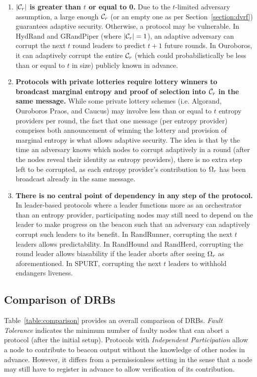 \begin{enumerate}
\item \textbf{$|\mathcal{C}_r|$ is greater than $t$ or equal to 0.} Due to the $t$-limited adversary assumption, a large enough $\mathcal{C}_r$ (or an empty one as per Section~\ref{section:dvrf}) guarantees adaptive security. Otherwise, a protocol may be vulnerable. In HydRand and GRandPiper (where $|\mathcal{C}_r| = 1$), an adaptive adversary can corrupt the next $t$ round leaders to predict $t + 1$ future rounds. In Ouroboros, it can adaptively corrupt the entire $\mathcal{C}_r$ (which could probabilistically be less than or equal to $t$ in size) publicly known in advance.
\item \textbf{Protocols with private lotteries require lottery winners to broadcast marginal entropy and proof of selection into $\mathcal{C}_r$ in the same message.} While some private lottery schemes (i.e. Algorand, Ouroboros Praos, and Caucus) may involve less than or equal to $t$ entropy providers per round, the fact that one message (per entropy provider) comprises both announcement of winning the lottery and provision of marginal entropy is what allows adaptive security. The idea is that by the time an adversary knows which nodes to corrupt adaptively in a round (after the nodes reveal their identity as entropy providers), there is no extra step left to be corrupted, as each entropy provider's contribution to $\Omega_r$ has been broadcast already in the same message.
\item \textbf{There is no central point of dependency in any step of the protocol.} In leader-based protocols where a leader functions more as an orchestrator than an entropy provider, participating nodes may still need to depend on the leader to make progress on the beacon such that an adversary can adaptively corrupt such leaders to its benefit. In RandRunner, corrupting the next $t$ leaders allows predictability. In RandHound and RandHerd, corrupting the round leader allows biasability if the leader aborts after seeing $\Omega_r$ as aforementioned. In SPURT, corrupting the next $t$ leaders to withhold endangers liveness.
\end{enumerate}

\subsection{Comparison of DRBs}
Table~\ref{table:comparison} provides an overall comparison of DRBs. \textit{Fault Tolerance} indicates the minimum number of faulty nodes that can abort a protocol (after the initial setup). Protocols with \textit{Independent Participation} allow a node to contribute to beacon output without the knowledge of other nodes in advance. However, it differs from a permissionless setting in the sense that a node may still have to register in advance to allow verification of its contribution.

